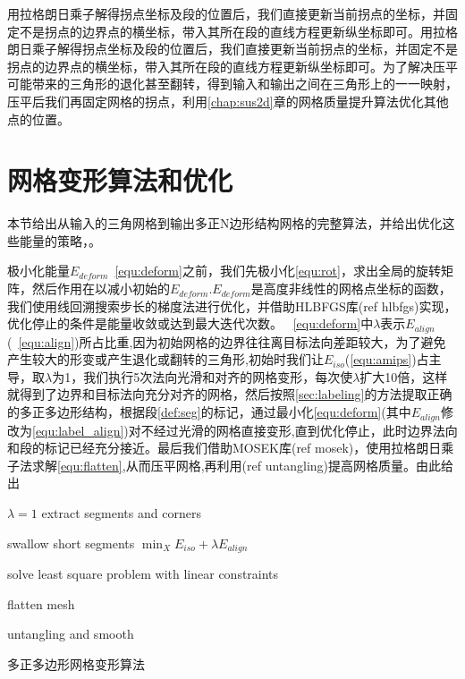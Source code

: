 用拉格朗日乘子解得拐点坐标及段的位置后，我们直接更新当前拐点的坐标，并固定不是拐点的边界点的横坐标，带入其所在段的直线方程更新纵坐标即可。用拉格朗日乘子解得拐点坐标及段的位置后，我们直接更新当前拐点的坐标，并固定不是拐点的边界点的横坐标，带入其所在段的直线方程更新纵坐标即可。为了解决压平可能带来的三角形的退化甚至翻转，得到输入和输出之间在三角形上的一一映射，压平后我们再固定网格的拐点，利用\ref{chap:sus2d}章的网格质量提升算法优化其他点的位置。

\section{网格变形算法和优化}\label{sec:def_alg}
本节给出从输入的三角网格到输出多正N边形结构网格的完整算法，并给出优化这些能量的策略，。

极小化能量$E_{deform}$~\ref{equ:deform}之前，我们先极小化\ref{equ:rot}，求出全局的旋转矩阵，然后作用在以减小初始的$E_{deform}$.$E_{deform}$是高度非线性的网格点坐标的函数，我们使用线回溯搜索步长的梯度法进行优化，并借助HLBFGS库(ref hlbfgs)实现，优化停止的条件是能量收敛或达到最大迭代次数。
~\ref{equ:deform}中$\lambda$表示$E_{align}$(~\ref{equ:align})所占比重,因为初始网格的边界往往离目标法向差距较大，为了避免产生较大的形变或产生退化或翻转的三角形,初始时我们让$E_{iso}$(\ref{equ:amips})占主导，取$\lambda$为1，我们执行5次法向光滑和对齐的网格变形，每次使$\lambda$扩大10倍，这样就得到了边界和目标法向充分对齐的网格，然后按照\ref{sec:labeling}的方法提取正确的多正多边形结构，根据段\ref{def:seg}的标记，通过最小化\ref{equ:deform}(其中$E_{align}$修改为\ref{equ:label_align})对不经过光滑的网格直接变形,直到优化停止，此时边界法向和段的标记已经充分接近。最后我们借助MOSEK库(ref mosek)，使用拉格朗日乘子法求解\ref{equ:flatten},从而压平网格,再利用(ref untangling)提高网格质量。由此给出
\IncMargin{1em}
\begin{algorithm}
	$\lambda=1$\;
	extract segments and corners\;
	
	swallow short segments\;
	$\min_X E_{iso}+\lambda E_{align}$\;
	
	solve least square problem with linear constraints\;
	
	flatten mesh\;
	
	untangling and smooth\;
	
\caption{多正多边形网格变形算法} \label{algo_polymesh deform}

\end{algorithm}
